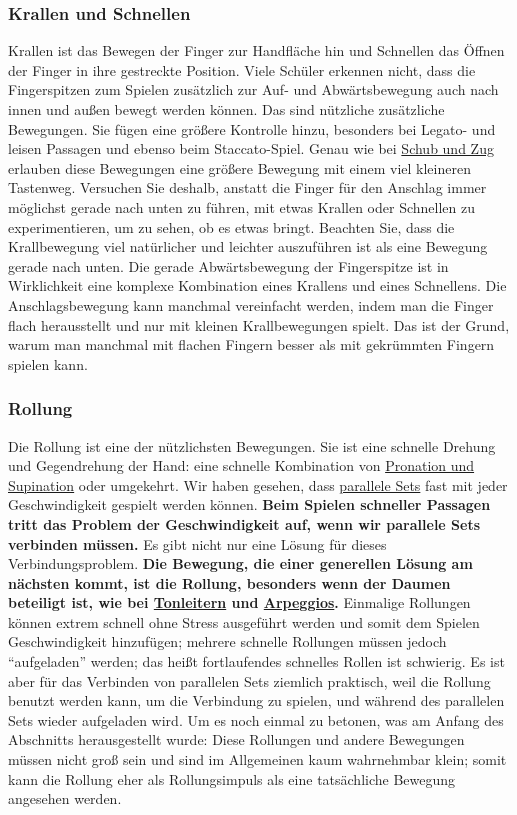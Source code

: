 \subsubsection{Krallen und Schnellen}

Krallen ist das Bewegen der Finger zur Handfläche hin und Schnellen das Öffnen der Finger in ihre gestreckte Position.
Viele Schüler erkennen nicht, dass die Fingerspitzen zum Spielen zusätzlich zur Auf- und Abwärtsbewegung auch nach innen und außen bewegt werden können.
Das sind nützliche zusätzliche Bewegungen.
Sie fügen eine größere Kontrolle hinzu, besonders bei Legato- und leisen Passagen und ebenso beim Staccato-Spiel.
Genau wie bei \hyperref[c1iii4SchubZug]{Schub und Zug} erlauben diese Bewegungen eine größere Bewegung mit einem viel kleineren Tastenweg.
Versuchen Sie deshalb, anstatt die Finger für den Anschlag immer möglichst gerade nach unten zu führen, mit etwas Krallen oder Schnellen zu experimentieren, um zu sehen, ob es etwas bringt.
Beachten Sie, dass die Krallbewegung viel natürlicher und leichter auszuführen ist als eine Bewegung gerade nach unten.
Die gerade Abwärtsbewegung der Fingerspitze ist in Wirklichkeit eine komplexe Kombination eines Krallens und eines Schnellens.
Die Anschlagsbewegung kann manchmal vereinfacht werden, indem man die Finger flach herausstellt und nur mit kleinen Krallbewegungen spielt.
Das ist der Grund, warum man manchmal mit flachen Fingern besser als mit gekrümmten Fingern spielen kann.


\subsubsection{Rollung}
\label{Rollung}

Die Rollung ist eine der nützlichsten Bewegungen.
Sie ist eine schnelle Drehung und Gegendrehung der Hand: eine schnelle Kombination von \hyperref[c1iii4ProSup]{Pronation und Supination} oder umgekehrt.
Wir haben gesehen, dass \hyperref[c1ii11]{parallele Sets} fast mit jeder Geschwindigkeit gespielt werden können.
\textbf{Beim Spielen schneller Passagen tritt das Problem der Geschwindigkeit auf, wenn wir parallele Sets verbinden müssen.}
Es gibt nicht nur eine Lösung für dieses Verbindungsproblem.
\textbf{Die Bewegung, die einer generellen Lösung am nächsten kommt, ist die Rollung, besonders wenn der Daumen beteiligt ist, wie bei \hyperref[c1iii5a]{Tonleitern} und \hyperref[Arpeggios]{Arpeggios}.}
Einmalige Rollungen können extrem schnell ohne Stress ausgeführt werden und somit dem Spielen Geschwindigkeit hinzufügen; mehrere schnelle Rollungen müssen jedoch \enquote{aufgeladen} werden; das heißt fortlaufendes schnelles Rollen ist schwierig.
Es ist aber für das Verbinden von parallelen Sets ziemlich praktisch, weil die Rollung benutzt werden kann, um die Verbindung zu spielen, und während des parallelen Sets wieder aufgeladen wird.
Um es noch einmal zu betonen, was am Anfang des Abschnitts herausgestellt wurde: Diese Rollungen und andere Bewegungen müssen nicht groß sein und sind im Allgemeinen kaum wahrnehmbar klein; somit kann die Rollung eher als Rollungsimpuls als eine tatsächliche Bewegung angesehen werden.


